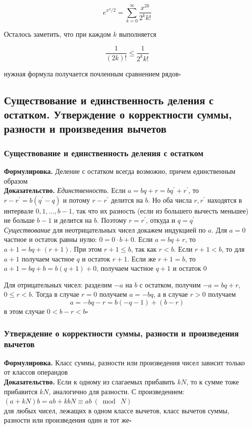 \documentclass[a4paper]{article}
\newcommand{\qed}{\hfill$\square$}
\begin{document}
$$
e^{x^{2} / 2}=\sum_{k=0}^{\infty} \frac{x^{2 k}}{2^{k} k !}
$$

Осталось заметить, что при каждом $k$ выполняется

$$
\frac{1}{(2 k) !} \leqslant \frac{1}{2^{k} k !}
$$

нужная формула получается почленным сравнением рядов\qed

\subsection{Существование и единственность деления с остатком. Утверждение о корректности суммы, разности и произведения вычетов}
\subsubsection*{Существование и единственность деления с остатком}\label{2.45}
\textbf{Формулировка.} Деление с остатком всегда возможно, причем единственным образом\\[4mm]
\indent\textbf{Доказательство.} \textit{Единственность}. Если $a=b q+r=b q^{\prime}+r^{\prime}$, то $r-r^{\prime}=b\left(q^{\prime}-q\right)$ и потому $r-r^{\prime}$ делится на $b$. Но оба числа $r, r^{\prime}$ находятся в интервале $0,1, \ldots, b-1$, так что их разность (если из большего вычесть меньшее) не больше $b-1$ и делится на $b$. Поэтому $r=r^{\prime}$, откуда и $q=q^{\prime}$\\[2mm]
\indent \textit{Существование} для неотрицательных чисел докажем индукцией по $a$. Для $a=0$ частное и остаток равны нулю: $0=0 \cdot b+0$. Если $a=b q+r$, то $a+1=b q+(r+1)$. При этом $r+1 \leqslant b$, так как $r<b$. Если $r+1<b$, то для $a+1$ получаем частное $q$ и остаток $r+1$. Если же $r+1=b$, то $a+1=b q+b=b(q+1)+0$, получаем частное $q+1$ и остаток 0

Для отрицательных чисел: разделим $-a$ на $b$ с остатком, получим $-a=b q+r$, $0 \leqslant r<b$. Тогда в случае $r=0$ получаем $a=-b q$, а в случае $r>0$ получаем
$$
a=-b q-r=b(-q-1)+(b-r)
$$
в этом случае $0<b-r<b$\qed

\subsubsection*{Утверждение о корректности суммы, разности и произведения вычетов}
\textbf{Формулировка.} Класс суммы, разности или произведения чисел зависит только от классов операндов\\[4mm]
\indent\textbf{Доказательство.} Если к одному из слагаемых прибавить $kN$, то к сумме тоже прибавится $kN$, аналогично для разности. С произведением: $(a + kN )b = ab + kbN \equiv ab\ (\bmod\ N)$\\[2mm]
 для любых чисел, лежащих в одном классе вычетов, класс вычетов суммы, разности или произведения один и тот же\qed
\end{document}
